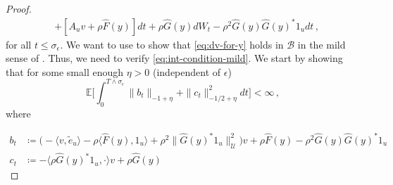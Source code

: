 \documentclass[final]{amsart}
\numberwithin{thm}{section}
\numberwithin{equation}{section}
\newcommand{\E}{\mathbb{E}}
\newcommand{\U}{\mathcal{U}}
\newcommand{\ip}[2]{\langle #1, #2 \rangle}
\newcommand{\B}{\mathcal{B}}
\begin{document}
\begin{proof}
\begin{equation}
\begin{aligned}
        &+[A_uv + \rho \hat F(y)]dt + \rho \hat G(y)dW_t - \rho^2\hat G(y)\hat G(y)^*1_udt \,,
    \end{aligned}
    \end{equation}
    for all $t \leq \sigma_\epsilon$. We want to use  to show that \eqref{eq:dv-for-y} holds in $\B$ in the mild sense of . Thus, we need to verify \eqref{eq:int-condition-mild}. We start by showing that for some small enough $\eta >0$ (independent of $\epsilon$)
    \begin{equation}\label{eq:desired-bc-bound}
        \E\Big[\int_0^{T\wedge \sigma_\epsilon} \|b_t\|_{-1+\eta} + \|c_t\|_{-1/2+\eta}^2dt\Big] < \infty \,,
    \end{equation}
    where
    
    \begin{align*}
        b_t &\coloneqq \Big(-\ip{v}{\tilde e_u} - \rho\ip{\hat F(y)}{1_u} + \rho^2\|\hat G(y)^*1_u\|_\U^2\Big)v + \rho \hat F(y) - \rho^2\hat G(y)\hat G(y)^*1_u \\
        c_t &\coloneqq - \ip{\rho\hat G(y)^*1_u}{\cdot}v + \rho \hat G(y)
    \end{align*}

    
    
    
    
    

    


    
    
    
    

\end{proof}
\end{document}
